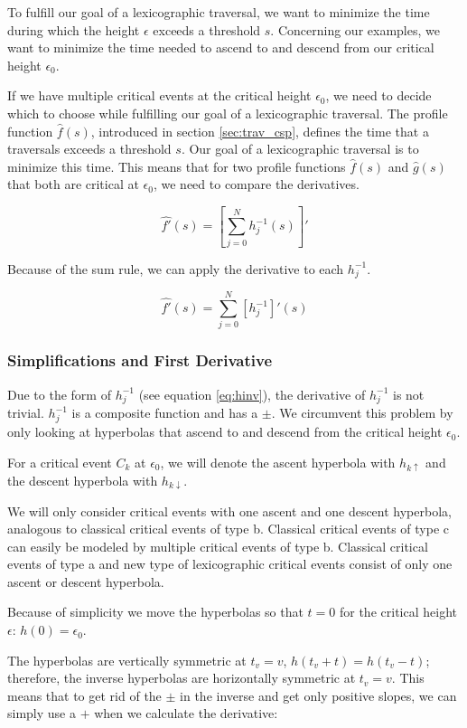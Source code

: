 To fulfill our goal of a lexicographic traversal, we want to minimize the time during which the height $\epsilon$ exceeds a threshold $s$.\cite{rotelex} Concerning our examples, we want to minimize the time needed to ascend to and descend from our critical height $\epsilon_0$.

If we have multiple critical events at the critical height $\epsilon_0$, we need to decide which to choose while fulfilling our goal of a lexicographic traversal. The profile function $\hat{f}(s)$, introduced in section \ref{sec:trav_csp}, defines the time that a traversals exceeds a threshold $s$. Our goal of a lexicographic traversal is to minimize this time. This means that for two profile functions $\hat{f}(s)$ and $\hat{g}(s)$ that both are critical at $\epsilon_0$, we need to compare the derivatives.

$$\hat{f'}(s) = \left[ \sum_{j=0}^N {h_j^{-1}(s)} \right]'$$

Because of the sum rule, we can apply the derivative to each $h_j^{-1}$.

$$\hat{f'}(s) = \sum_{j=0}^N {[h_j^{-1}]'(s)}$$


\subsubsection{Simplifications and First Derivative}\label{sec:first_derivative}

Due to the form of $h_j^{-1}$ (see equation \ref{eq:hinv}), the derivative of $h_j^{-1}$ is not trivial. $h_j^{-1}$ is a composite function and has a $\pm$. We circumvent this problem by only looking at hyperbolas that ascend to and descend from the critical height $\epsilon_0$.

For a critical event $C_k$ at $\epsilon_0$, we will denote the ascent hyperbola with $h_{k\uparrow}$ and the descent hyperbola with $h_{k\downarrow}$.

We will only consider critical events with one ascent and one descent hyperbola, analogous to classical critical events of type b. Classical critical events of type c can easily be modeled by multiple critical events of type b. Classical critical events of type a and new type of lexicographic critical events consist of only one ascent or descent hyperbola.

Because of simplicity we move the hyperbolas so that $t = 0$ for the critical height $\epsilon$: $h(0) = \epsilon_0$.

The hyperbolas are vertically symmetric at $t_v=v$, $h(t_v+t) = h(t_v-t)$; therefore, the inverse hyperbolas are horizontally symmetric at $t_v = v$. This means that to get rid of the $\pm$ in the inverse and get only positive slopes, we can simply use a $+$ when we calculate the derivative:

